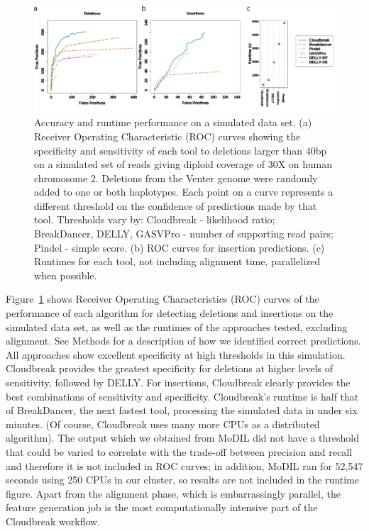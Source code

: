 \documentclass [11pt] {report}
\newcommand{\todo}[1]{}
\begin{document}
\begin{figure}
\centering
\includegraphics[width=1\textwidth]{figures/chr2_sim_rocs_runtime.pdf}
\caption{Accuracy and runtime performance on a simulated data set. (a) Receiver Operating Characteristic (ROC) curves showing the specificity and sensitivity of each tool to deletions larger than 40bp on a simulated set of reads giving diploid coverage of 30X on human chromosome 2. Deletions from the Venter genome were randomly added to one or both haplotypes. Each point on a curve represents a different threshold on the confidence of predictions made by that tool. Thresholds vary by: Cloudbreak - likelihood ratio; BreakDancer, DELLY, GASVPro - number of supporting read pairs; Pindel - simple score. (b) ROC curves for insertion predictions. (c) Runtimes for each tool, not including alignment time, parallelized when possible.}
\label{chr2CombinedRoc}
\end{figure}

Figure~\ref{chr2CombinedRoc} shows Receiver Operating Characteristics (ROC) curves of the performance of each algorithm for detecting deletions and insertions on the simulated data set, as well as the runtimes of the approaches tested, excluding alignment. See Methods for a description of how we identified correct predictions. All approaches show excellent specificity at high thresholds in this simulation. Cloudbreak provides the greatest specificity for deletions at higher levels of sensitivity, followed by DELLY. For insertions, Cloudbreak clearly provides the best combinations of sensitivity and specificity. Cloudbreak's runtime is half that of BreakDancer, the next fastest tool, processing the simulated data in under six minutes. (Of course, Cloudbreak uses many more CPUs as a distributed algorithm). \todo{See Supplementary Material and Supplementary Table~\ref{Sruntimes} for a discussion of runtimes and parallelization.} The output which we obtained from MoDIL did not have a threshold that could be varied to correlate with the trade-off between precision and recall and therefore it is not included in ROC curves; in addition, MoDIL ran for 52,547 seconds using 250 CPUs in our cluster, so results are not included in the runtime figure. Apart from the alignment phase, which is embarrassingly parallel, the feature generation job is the most computationally intensive part of the Cloudbreak workflow. \todo{Therefore, to test scalability we measured the runtime of that job on Hadoop clusters made up of varying numbers of nodes and observed that linear speedups can be achieved in this portion of the algorithm by adding additional nodes to the cluster until a point of diminishing returns is reached (Figure~\ref{scalability}).}
\end{document}

